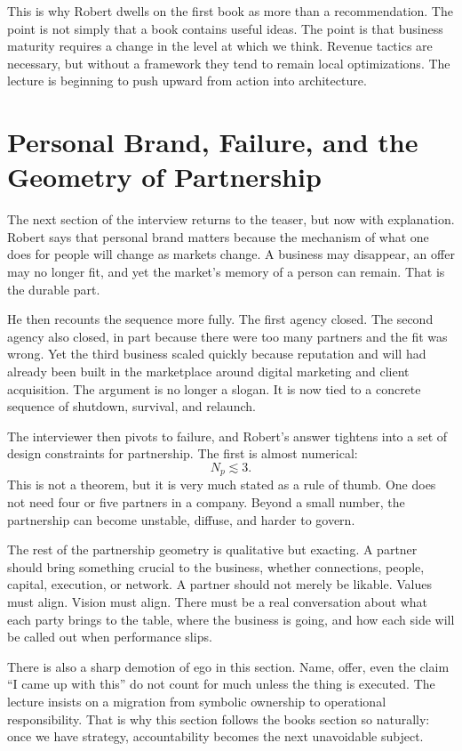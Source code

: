 This is why Robert dwells on the first book as more than a recommendation. The point is not simply that a book contains useful ideas. The point is that business maturity requires a change in the level at which we think. Revenue tactics are necessary, but without a framework they tend to remain local optimizations. The lecture is beginning to push upward from action into architecture.

\section{Personal Brand, Failure, and the Geometry of Partnership}

The next section of the interview returns to the teaser, but now with explanation. Robert says that personal brand matters because the mechanism of what one does for people will change as markets change. A business may disappear, an offer may no longer fit, and yet the market's memory of a person can remain. That is the durable part.

He then recounts the sequence more fully. The first agency closed. The second agency also closed, in part because there were too many partners and the fit was wrong. Yet the third business scaled quickly because reputation and will had already been built in the marketplace around digital marketing and client acquisition. The argument is no longer a slogan. It is now tied to a concrete sequence of shutdown, survival, and relaunch.

The interviewer then pivots to failure, and Robert's answer tightens into a set of design constraints for partnership. The first is almost numerical:
\begin{equation}
N_p \lesssim 3.
\end{equation}
This is not a theorem, but it is very much stated as a rule of thumb. One does not need four or five partners in a company. Beyond a small number, the partnership can become unstable, diffuse, and harder to govern.

The rest of the partnership geometry is qualitative but exacting. A partner should bring something crucial to the business, whether connections, people, capital, execution, or network. A partner should not merely be likable. Values must align. Vision must align. There must be a real conversation about what each party brings to the table, where the business is going, and how each side will be called out when performance slips.

There is also a sharp demotion of ego in this section. Name, offer, even the claim ``I came up with this'' do not count for much unless the thing is executed. The lecture insists on a migration from symbolic ownership to operational responsibility. That is why this section follows the books section so naturally: once we have strategy, accountability becomes the next unavoidable subject.

